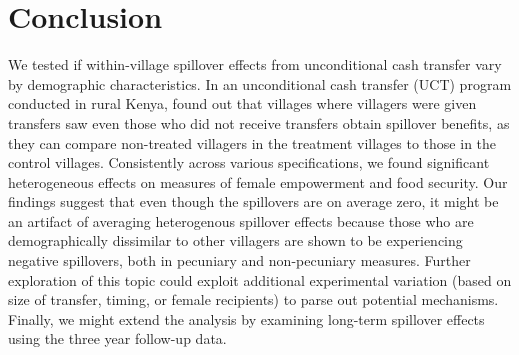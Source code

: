 \documentclass[11pt]{article}
\begin{document}
\section{Conclusion}

    We tested if within-village spillover effects from unconditional cash transfer vary by demographic characteristics. In an unconditional cash transfer (UCT) program conducted in rural Kenya, \textcite{haushofer_short-term_2016} found out that villages where villagers were given transfers saw even those who did not receive transfers obtain spillover benefits, as they can compare non-treated villagers in the treatment villages to those in the control villages. Consistently across various specifications, we found significant heterogeneous effects on measures of female empowerment and food security. Our findings suggest that even though the spillovers are on average zero, it might be an artifact of averaging heterogenous spillover effects because those who are demographically dissimilar to other villagers are shown to be experiencing negative spillovers, both in pecuniary and non-pecuniary measures. Further exploration of this topic could exploit additional experimental variation (based on size of transfer, timing, or female recipients) to parse out potential mechanisms. Finally, we might extend the analysis by examining long-term spillover effects using the three year follow-up data.

\printbibliography
\end{document}
